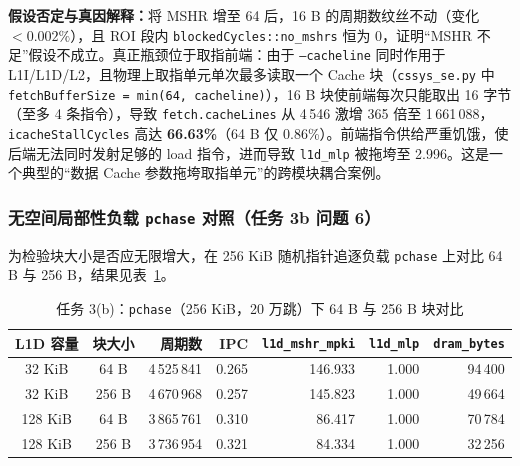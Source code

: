 \documentclass[12pt,a4paper,fontset=mac]{ctexart}
\begin{document}
\textbf{假设否定与真因解释：}将 MSHR 增至 64 后，16 B 的周期数纹丝不动（变化 $<0.002\%$），且 ROI 段内 \texttt{blockedCycles::no\_mshrs} 恒为 0，证明“MSHR 不足”假设不成立。真正瓶颈位于取指前端：由于 \texttt{--cacheline} 同时作用于 L1I/L1D/L2，且物理上取指单元单次最多读取一个 Cache 块（\texttt{cssys\_se.py} 中 \texttt{fetchBufferSize = min(64, cacheline)}），16 B 块使前端每次只能取出 16 字节（至多 4 条指令），导致 \texttt{fetch.cacheLines} 从 4\,546 激增 365 倍至 1\,661\,088，\texttt{icacheStallCycles} 高达 \textbf{66.63\%}（64 B 仅 0.86\%）。前端指令供给严重饥饿，使后端无法同时发射足够的 load 指令，进而导致 \texttt{l1d\_mlp} 被拖垮至 2.996。这是一个典型的“数据 Cache 参数拖垮取指单元”的跨模块耦合案例。

\subsubsection{无空间局部性负载 \texttt{pchase} 对照（任务 3b 问题 6）}
为检验块大小是否应无限增大，在 256 KiB 随机指针追逐负载 \texttt{pchase} 上对比 64 B 与 256 B，结果见表~\ref{tab:task3pchase}。

\begin{table}[H]\centering\small
\caption{任务 3(b)：\texttt{pchase}（256 KiB，20 万跳）下 64 B 与 256 B 块对比}\label{tab:task3pchase}
\begin{tabular}{ccrrrrr}\toprule
L1D 容量 & 块大小 & 周期数 & IPC & \texttt{l1d\_mshr\_mpki} & \texttt{l1d\_mlp} & \texttt{dram\_bytes} \\\midrule
32 KiB  & 64 B  & 4\,525\,841 & 0.265 & 146.933 & 1.000 & 94\,400 \\
32 KiB  & 256 B & 4\,670\,968 & 0.257 & 145.823 & 1.000 & 49\,664 \\
128 KiB & 64 B  & 3\,865\,761 & 0.310 & 86.417  & 1.000 & 70\,784 \\
128 KiB & 256 B & 3\,736\,954 & 0.321 & 84.334  & 1.000 & 32\,256 \\
\bottomrule\end{tabular}
\end{table}
\end{document}
